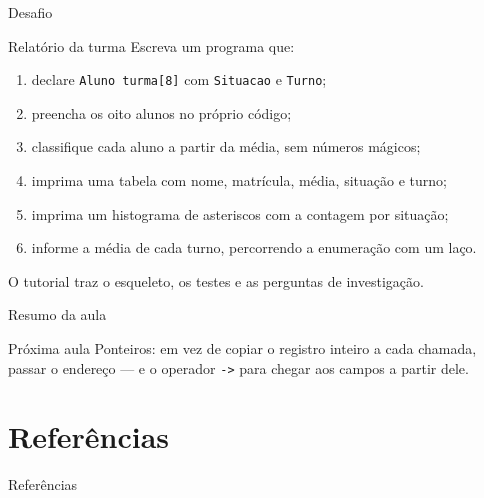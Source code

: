 \documentclass[aspectratio=169]{beamer}
\begin{document}
\begin{frame}{Desafio}
  \begin{exampleblock}{Relatório da turma}
    Escreva um programa que:
    \begin{enumerate}
      \item declare \texttt{Aluno turma[8]} com \texttt{Situacao} e \texttt{Turno};
      \item preencha os oito alunos no próprio código;
      \item classifique cada aluno a partir da média, sem números mágicos;
      \item imprima uma tabela com nome, matrícula, média, situação e turno;
      \item imprima um histograma de asteriscos com a contagem por situação;
      \item informe a média de cada turno, percorrendo a enumeração com um laço.
    \end{enumerate}
    O tutorial traz o esqueleto, os testes e as perguntas de investigação.
  \end{exampleblock}
\end{frame}

\begin{frame}{Resumo da aula}
  \begin{center}
  \end{center}
  \begin{block}{Próxima aula}
    Ponteiros: em vez de copiar o registro inteiro a cada chamada, passar o
    endereço --- e o operador \texttt{->} para chegar aos campos a partir dele.
  \end{block}
\end{frame}

\section*{Referências}
\begin{frame}[allowframebreaks]{Referências}
  \scriptsize
  \nocite{*}
  
  
\end{frame}
\end{document}
